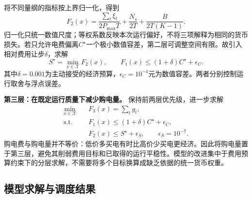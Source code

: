 \documentclass[withoutpreface,bwprint]{cumcmthesis}
\begin{document}
将不同量纲的指标按上界归一化，得到
\begin{equation}
 F_2(x)=\frac{\sum_t\xi_t}{2P_{\max}T}
       +\frac{N_s}{2T}+\frac{B}{2T(K-1)} .
 \label{eq:q1-second}
\end{equation}
归一化只统一数值尺度；等权系数反映本次运行偏好，不将三项解释为相同的货币损失。若只允许电费偏离$C^\star$一个极小数值容差，第二层可调整空间有限。故引入相对费用让步$\delta$，求解
\begin{equation}
 S^\star=\min_{x\in\mathcal X}F_2(x),\qquad
 F_1(x)\leq(1+\delta)C^\star+\epsilon_C .
 \label{eq:q1-budget}
\end{equation}
其中$\delta=0.001$为主动接受的经济预算，$\epsilon_C=10^{-4}$元为数值容差。两者分别控制运行取舍与浮点误差。

\textbf{第三层：在既定运行质量下减少购电量。}
保持前两层优先级，进一步求解
\begin{equation}
 \begin{aligned}
 \min_{x\in\mathcal X}\quad &F_3(x)=\sum_tg_t,\\
 \mathrm{s.t.}\quad&
 F_1(x)\leq(1+\delta)C^\star+\epsilon_C,\\
 &F_2(x)\leq S^\star+\epsilon_S,\qquad\epsilon_S=10^{-7}.
 \end{aligned}
 \label{eq:q1-third}
\end{equation}
购电费与购电量并不等价：低价多买电有时比高价少买电更经济。因此将购电量置于第三层，避免其削弱费用目标和已取得的运行平稳性。模型的改进集中于费用预算约束下的分层求解，不需要将多个目标换算成缺乏依据的统一货币权重。

\subsection{模型求解与调度结果}
\end{document}
